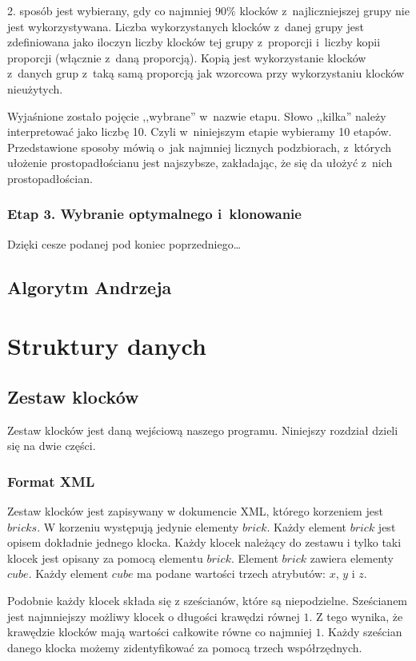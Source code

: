 \documentclass[12pt]{article}
\begin{document}
2. sposób jest wybierany, gdy co najmniej
$90\%$ klocków z~najliczniejszej grupy nie jest wykorzystywana.
Liczba wykorzystanych klocków z~danej grupy jest zdefiniowana jako iloczyn
liczby klocków tej grupy z~proporcji i~liczby kopii proporcji (włącznie
z~daną proporcją). Kopią jest wykorzystanie klocków z~danych grup z~taką
samą proporcją jak wzorcowa przy wykorzystaniu klocków nieużytych. 

Wyjaśnione zostało pojęcie ,,wybrane'' w~nazwie etapu. Słowo ,,kilka''
należy interpretować jako liczbę 10. Czyli w~niniejszym etapie wybieramy
10 etapów. Przedstawione sposoby mówią o~jak najmniej licznych podzbiorach,
z~których ułożenie prostopadłościanu jest najszybsze, zakładając, że się
da ułożyć z~nich prostopadłościan.

\subsubsection{Etap 3. Wybranie optymalnego i~klonowanie}
Dzięki cesze podanej pod koniec poprzedniego\ldots

\subsection{Algorytm Andrzeja}

\section{Struktury danych}

\subsection{Zestaw klocków}
Zestaw klocków jest daną wejściową naszego programu. Niniejszy rozdział
dzieli się na dwie części.

\subsubsection{Format XML}\label{sec:zapis}
Zestaw klocków jest zapisywany w dokumencie XML, którego korzeniem jest
$bricks$. W korzeniu występują jedynie elementy $brick$. Każdy element
$brick$ jest opisem dokładnie jednego klocka. Każdy klocek należący do
zestawu i tylko taki klocek jest opisany za pomocą elementu $brick$.
Element $brick$ zawiera elementy $cube$. Każdy element $cube$ ma podane
wartości trzech atrybutów: $x$, $y$ i $z$.

Podobnie każdy klocek składa się
z sześcianów, które są niepodzielne. Sześcianem jest najmniejszy możliwy
klocek o długości krawędzi równej $1$. Z tego wynika, że krawędzie klocków
mają wartości całkowite równe co najmniej $1$. Każdy sześcian danego
klocka możemy zidentyfikować za pomocą trzech współrzędnych.
\end{document}
